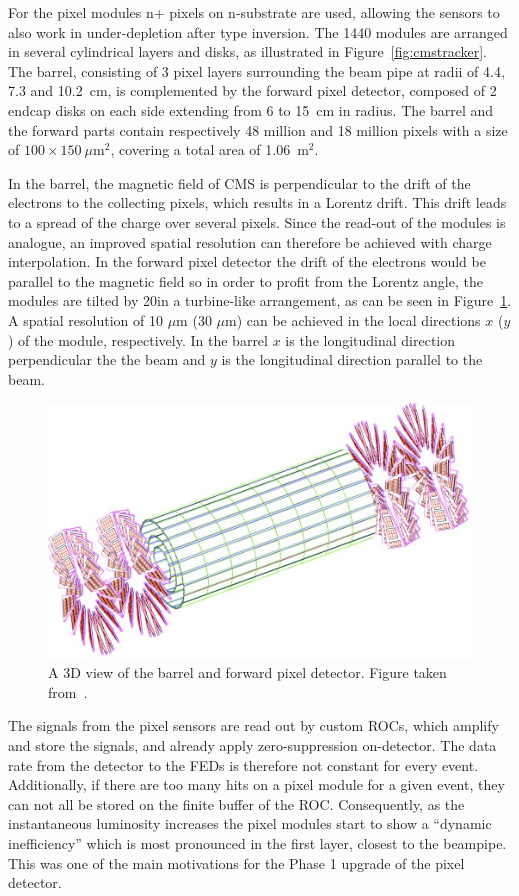 For the pixel modules n+ pixels on n-substrate are used, allowing the sensors to also work in under-depletion after type inversion. The 1440 modules are arranged in several cylindrical layers and disks, as illustrated in Figure~\ref{fig:cmstracker}. The barrel, consisting of 3 pixel layers surrounding the beam pipe at radii of 4.4, 7.3 and 10.2~cm, is complemented by the forward pixel detector, composed of 2 endcap disks on each side extending from 6 to 15~cm in radius. The barrel and the forward parts contain respectively 48 million and 18 million pixels with a size of $100 \times 150\ \mu\mathrm{m}^2$, covering a total area of 1.06~m$^2$.

In the barrel, the magnetic field of CMS is perpendicular to the drift of the electrons to the collecting pixels, which results in a Lorentz drift. This drift leads to a spread of the charge over several pixels. Since the read-out of the modules is analogue, an improved spatial resolution can therefore be achieved with charge interpolation. In the forward pixel detector the drift of the electrons would be parallel to the magnetic field so in order to profit from the Lorentz angle, the modules are tilted by 20\degree in a turbine-like arrangement, as can be seen in Figure~\ref{fig:pix}. A spatial resolution of 10 $\mu$m (30 $\mu$m) can be achieved in the local directions $x$ ($y$) of the module, respectively. In the barrel $x$ is the longitudinal direction perpendicular the the beam and $y$ is the longitudinal direction parallel to the beam. 

\begin{figure}[ht]
  \centering
 \includegraphics[width=.6\textwidth]{pixel.jpg}
 \caption{A 3D view of the barrel and forward pixel detector. Figure taken from~\cite{Bayatian:2006nff}.}
 \label{fig:pix}
\end{figure}

The signals from the pixel sensors are read out by custom \acp{ROC}, which amplify and store the signals, and already apply zero-suppression on-detector. The data rate from the detector to the \acp{FED} is therefore not constant for every event. Additionally, if there are too many hits on a pixel module for a given event, they can not all be stored on the finite buffer of the \ac{ROC}. Consequently, as the instantaneous luminosity increases the pixel modules start to show a ``dynamic inefficiency''  which is most pronounced in the first layer, closest to the beampipe. This was one of the main motivations for the Phase 1 upgrade of the pixel detector.


